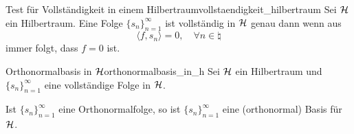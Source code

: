 \begin{mytheo}{Test für Vollständigkeit in einem Hilbertraum}{vollstaendigkeit_hilbertraum}
  Sei $\mathcal{H}$ ein Hilbertraum.
  Eine Folge ${\{s_n\}}_{n=1}^\infty$ ist vollständig in $\mathcal{H}$ genau dann wenn aus
  \begin{equation*}
    \langle f, s_n \rangle = 0, \quad \forall n\in\natural
  \end{equation*}
  immer folgt, dass $f = 0$ ist.
\end{mytheo}

\begin{mytheo}{Orthonormalbasis in $\mathcal{H}$}{orthonormalbasis_in_h}
  Sei $\mathcal{H}$ ein Hilbertraum und ${\{s_n\}}_{n=1}^{\infty}$ eine vollständige Folge in $\mathcal{H}$.

  Ist ${\{s_n\}}_{n=1}^\infty$ eine Orthonormalfolge, so ist ${\{s_n\}}_{n=1}^\infty$ eine (orthonormal) Basis für $\mathcal{H}$.
\end{mytheo}
